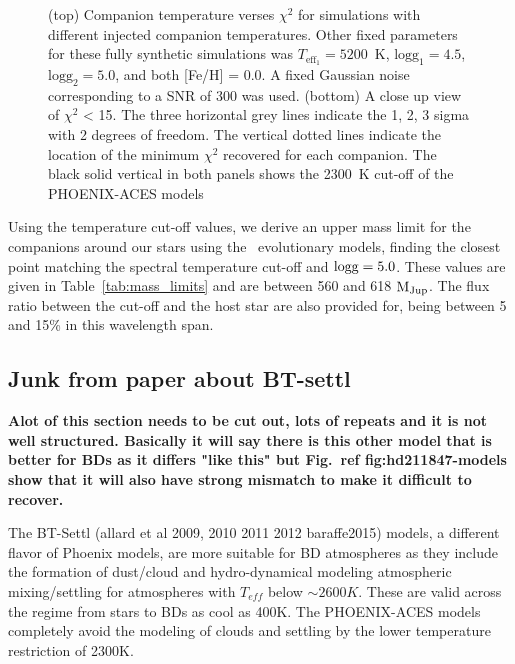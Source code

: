 \begin{figure}
    \centering
    \caption{(top) Companion temperature verses \(\chi^2\) for simulations with different injected companion temperatures. Other fixed parameters for these fully synthetic simulations was \(T_{\textrm{eff}_1}=5200\)~K, \(\textrm{logg}_1=4.5\), \(\textrm{logg}_2=5.0\), and both [Fe/H] = 0.0. A fixed Gaussian noise corresponding to a SNR of 300 was used.
        (bottom) A close up view of \(\chi^2\) < 15. The three horizontal grey lines indicate the 1, 2, 3 sigma with 2 degrees of freedom. The vertical dotted lines indicate the location of the minimum \(\chi^2\) recovered for each companion. The black solid vertical in both panels shows the 2300~K cut-off of the PHOENIX-ACES models}
    \label{fig:injection_shape}
\end{figure}




Using the temperature cut-off values, we derive an upper mass limit for the companions around our stars using the~\citet{baraffe_new_2015} evolutionary models, finding the closest point matching the spectral temperature cut-off and \(\rm logg=5.0\). These values are given in Table~\ref{tab:mass_limits} and are between 560 and 618 \(\rm M_{Jup}\). The flux ratio between the cut-off and the host star are also provided for, being between 5 and 15\% in this wavelength span.













\subsection{Junk from paper about BT-settl}


\textbf{Alot of this section needs to be cut out, lots of repeats and it is not well structured. Basically it will say there is this other model that is better for BDs as it differs "like this" but Fig.~\textbf{ref {fig:hd211847-models}} show that it will also have strong mismatch to make it difficult to recover.}

\label{bt-setll}
The BT-Settl (allard et al 2009, 2010 2011 2012 baraffe2015) models, a different flavor of Phoenix models, are more suitable for BD atmospheres as they include the formation of dust/cloud and hydro-dynamical modeling atmospheric mixing/settling for atmospheres with \(T_{eff}\) below \(\sim2600K\). These are valid across the regime from stars to BDs as cool as 400K. The PHOENIX-ACES models completely avoid the modeling of clouds and settling by the lower temperature restriction of 2300K.

